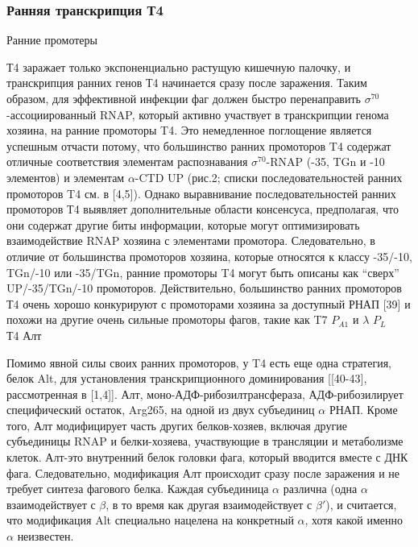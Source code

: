 \documentclass[a4paper,12pt]{article}
\begin{document}
\begin{center}
  \item  \subsubsection{Ранняя транскрипция Т4}
\end{center}
        {\Large Ранние промотеры}
            \par{Т4 заражает только экспоненциально растущую кишечную палочку, и транскрипция ранних генов Т4 начинается сразу
            после заражения. Таким образом, для эффективной инфекции фаг должен быстро перенаправить
            \(\sigma^{70}\)-ассоциированный RNAP, который активно участвует в транскрипции генома хозяина, на ранние
            промоторы T4. Это немедленное поглощение является успешным отчасти потому, что большинство ранних промоторов
            T4 содержат отличные соответствия элементам распознавания \(\sigma^{70}\)-RNAP (-35, TGn и -10 элементов) и
            элементам \(\alpha\)-CTD UP (рис.2; списки последовательностей ранних промоторов T4 см. в [4,5]). Однако
            выравнивание последовательностей ранних промоторов Т4 выявляет дополнительные области консенсуса,
            предполагая, что они содержат другие биты информации, которые могут оптимизировать взаимодействие RNAP
            хозяина с элементами промотора. Следовательно, в отличие от большинства промоторов хозяина, которые относятся
            к классу -35/-10, TGn/-10 или -35/TGn, ранние промоторы T4 могут быть описаны как “сверх” UP/-35/TGn/-10
            промоторов. Действительно, большинство ранних промоторов Т4 очень хорошо конкурируют с промоторами хозяина за
            доступный РНАП [39] и похожи на другие очень сильные промоторы фагов, такие как T7 \(P_{A1}\) и \(\lambda\)
            $ P_L $}\\
        { Т4 Алт}
            \par{Помимо явной силы своих ранних промоторов, у T4 есть еще одна стратегия, белок Alt, для установления
            транскрипционного доминирования [[40-43], рассмотренная в [1,4]]. Алт, моно-АДФ-рибозилтрансфераза,
            АДФ-рибозилирует специфический остаток, Arg265, на одной из двух субъединиц \(\alpha\) РНАП. Кроме того, Алт
            модифицирует часть других белков-хозяев, включая другие субъединицы RNAP и белки-хозяева, участвующие в
            трансляции и метаболизме клеток. Алт-это внутренний белок головки фага, который вводится вместе с ДНК фага.
            Следовательно, модификация Алт происходит сразу после заражения и не требует синтеза фагового белка. Каждая
            субъединица \(\alpha\) различна (одна \(\alpha\) взаимодействует с \(\beta\), в то время как другая
            взаимодействует с \(\beta'\)), и считается, что модификация Alt специально нацелена на конкретный \(\alpha\),
            хотя какой именно \(\alpha\) неизвестен.}
\end{document}
